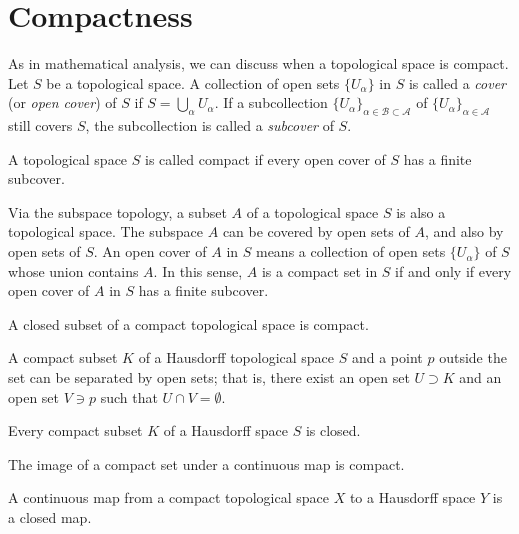 \section{Compactness}
As in mathematical analysis, we can discuss when a topological space is
compact. Let $S$ be a topological space. A collection of open sets
$\{U_\alpha\}$ in $S$ is called a \emph{cover} (or \emph{open cover}) of $S$
if $S = \bigcup_\alpha U_\alpha$. If a subcollection
$\{U_\alpha\}_{\alpha\in\mathcal{B}\subset\mathcal{A}}$ of
$\{U_\alpha\}_{\alpha\in \mathcal{A}}$ still covers $S$, the subcollection is
called a \emph{subcover} of $S$.

\begin{definition}
	A topological space $S$ is called compact if every open cover of $S$ has
	a finite subcover.
\end{definition}

Via the subspace topology, a subset $A$ of a topological space $S$ is also a
topological space. The subspace $A$ can be covered by open sets of $A$, and
also by open sets of $S$. An open cover of $A$ in $S$ means a collection of
open sets $\{U_\alpha\}$ of $S$ whose union contains $A$. In this sense, $A$
is a compact set in $S$ if and only if every open cover of $A$ in $S$ has a
finite subcover.

\begin{proposition}
	A closed subset of a compact topological space is compact.
\end{proposition}

\begin{proposition}
	A compact subset $K$ of a Hausdorff topological space $S$ and a point
	$p$ outside the set can be separated by open sets; that is, there exist
	an open set $U\supset K$ and an open set $V\ni p$ such that $U\cap
		V=\emptyset$.
\end{proposition}


\begin{proposition}
	Every compact subset $K$ of a Hausdorff space $S$ is closed.
\end{proposition}


\begin{proposition}
	The image of a compact set under a continuous map is compact.
\end{proposition}


\begin{proposition}
	A continuous map from a compact topological space $X$ to a Hausdorff
	space $Y$ is a closed map.
\end{proposition}



